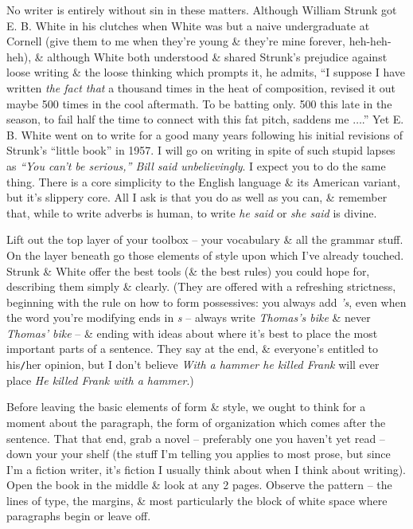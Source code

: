 \documentclass{article}
\numberwithin{equation}{section}
\begin{document}
No writer is entirely without sin in these matters. Although William Strunk got E. B. White in his clutches when White was but a naive undergraduate at Cornell (give them to me when they're young \& they're mine forever, heh-heh-heh), \& although White both understood \& shared Strunk's prejudice against loose writing \& the loose thinking which prompts it, he admits, ``I suppose I have written \textit{the fact that} a thousand times in the heat of composition, revised it out maybe 500 times in the cool aftermath. To be batting only. 500 this late in the season, to fail half the time to connect with this fat pitch, saddens me $\ldots$.'' Yet E. B. White went on to write for a good many years following his initial revisions of Strunk's ``little book'' in 1957. I will go on writing in spite of such stupid lapses as \textit{``You can't be serious,'' Bill said unbelievingly}. I expect you to do the same thing. There is a core simplicity to the English language \& its American variant, but it's slippery core. All I ask is that you do as well as you can, \& remember that, while to write adverbs is human, to write \textit{he said} or \textit{she said} is divine.

 Lift out the top layer of your toolbox -- your vocabulary \& all the grammar stuff. On the layer beneath go those elements of style upon which I've already touched. Strunk \& White offer the best tools (\& the best rules) you could hope for, describing them simply \& clearly. (They are offered with a refreshing strictness, beginning with the rule on how to form possessives: you always add \textit{'s}, even when the word you're modifying ends in \textit{s} -- always write \textit{Thomas's bike} \& never \textit{Thomas' bike} -- \& ending with ideas about where it's best to place the most important parts of a sentence. They say at the end, \& everyone's entitled to his{\tt/}her opinion, but I don't believe \textit{With a hammer he killed Frank} will ever place \textit{He killed Frank with a hammer}.)

Before leaving the basic elements of form \& style, we ought to think for a moment about the paragraph, the form of organization which comes after the sentence. That that end, grab a novel -- preferably one you haven't yet read -- down your your shelf (the stuff I'm telling you applies to most prose, but since I'm a fiction writer, it's fiction I usually think about when I think about writing). Open the book in the middle \& look at any 2 pages. Observe the pattern -- the lines of type, the margins, \& most particularly the block of white space where paragraphs begin or leave off.
\end{document}
